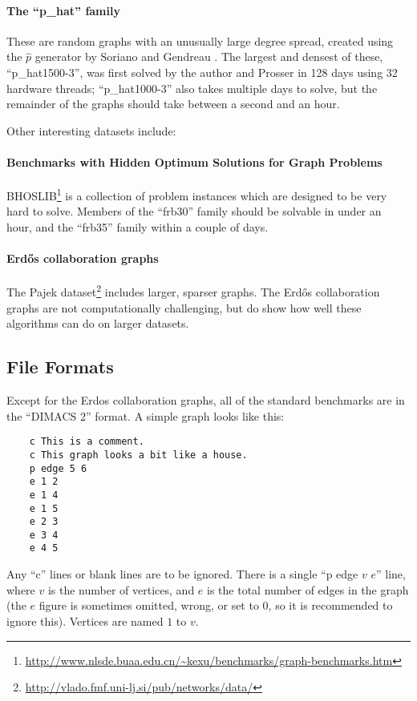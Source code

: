 \documentclass[a4paper]{article}
\begin{document}
\paragraph{The ``p\_hat'' family} These are random graphs with an unusually large degree spread,
created using the $\hat{p}$ generator by Soriano and Gendreau \cite{Soriano:1996}. The largest and
densest of these, ``p\_hat1500-3'', was first solved by the author and Prosser \cite{McCreesh:2013}
in 128 days using 32 hardware threads; ``p\_hat1000-3'' also takes multiple days to solve, but the
remainder of the graphs should take between a second and an hour.

\bigskip

\noindent Other interesting datasets include:

\paragraph{Benchmarks with Hidden Optimum Solutions for Graph Problems}
BHOSLIB\footnote{\url{http://www.nlsde.buaa.edu.cn/~kexu/benchmarks/graph-benchmarks.htm}} is a
collection of problem instances which are designed to be very hard to solve. Members of the
``frb30'' family should be solvable in under an hour, and the ``frb35'' family within a couple of
days.

\paragraph{Erd\H{o}s collaboration graphs} The Pajek
dataset\footnote{\url{http://vlado.fmf.uni-lj.si/pub/networks/data/}} includes larger, sparser
graphs. The Erd\H{o}s collaboration graphs are not computationally challenging, but do show how well
these algorithms can do on larger datasets.

\subsection{File Formats}

Except for the Erdos collaboration graphs, all of the standard benchmarks are in the ``DIMACS 2''
format. A simple graph looks like this:

\begin{verbatim}
    c This is a comment.
    c This graph looks a bit like a house.
    p edge 5 6
    e 1 2
    e 1 4
    e 1 5
    e 2 3
    e 3 4
    e 4 5
\end{verbatim}

Any ``c'' lines or blank lines are to be ignored.  There is a single ``p edge $v$ $e$'' line, where
$v$ is the number of vertices, and $e$ is the total number of edges in the graph (the $e$ figure is
sometimes omitted, wrong, or set to 0, so it is recommended to ignore this). Vertices are named $1$
to $v$.
\end{document}
